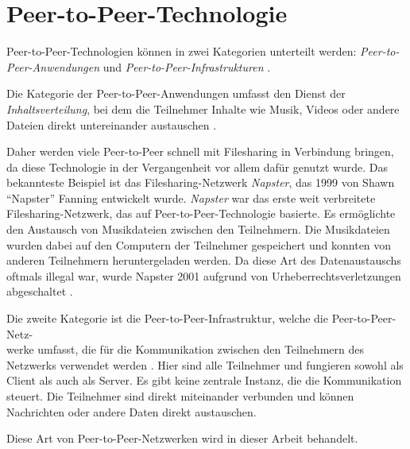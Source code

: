 \section{Peer-to-Peer-Technologie}
\label{subsec:peer_to_peer_technologie}

Peer-to-Peer-Technologien können in zwei Kategorien unterteilt werden: \textit{Peer-to-Peer-Anwendungen} und \textit{Peer-to-Peer-Infrastrukturen} \parencite[S. 730]{Khatibi_StructuredUnstructuredP2P}. 

Die Kategorie der Peer-to-Peer-Anwendungen umfasst den Dienst der \textit{Inhaltsverteilung}, bei dem die Teilnehmer Inhalte wie Musik, Videos oder andere Dateien direkt untereinander austauschen \Parencite[730-731]{Khatibi_StructuredUnstructuredP2P}. 

Daher werden viele Peer-to-Peer schnell mit Filesharing in Verbindung bringen, da diese Technologie in der Vergangenheit vor allem dafür genutzt wurde. Das bekannteste Beispiel ist das Filesharing-Netzwerk \textit{Napster}, das 1999 von Shawn \enquote{Napster} Fanning entwickelt wurde. \textit{Napster} war das erste weit verbreitete Filesharing-Netzwerk, das auf Peer-to-Peer-Technologie basierte. Es ermöglichte den Austausch von Musikdateien zwischen den Teilnehmern. Die Musikdateien wurden dabei auf den Computern der Teilnehmer gespeichert und konnten von anderen Teilnehmern heruntergeladen werden. Da diese Art des Datenaustauschs oftmals illegal war, wurde Napster 2001 aufgrund von Urheberrechtsverletzungen abgeschaltet \parencite[S. 55-57]{Mahlmann_P2PNetzwerke}.

Die zweite Kategorie ist die Peer-to-Peer-Infrastruktur, welche die Peer-to-Peer-Netz-\\werke umfasst, die für die Kommunikation zwischen den Teilnehmern des Netzwerks verwendet werden \parencite[S. 730-731]{Khatibi_StructuredUnstructuredP2P}. Hier sind alle Teilnehmer und fungieren sowohl als Client als auch als Server. Es gibt keine zentrale Instanz, die die Kommunikation steuert. Die Teilnehmer sind direkt miteinander verbunden und können Nachrichten oder andere Daten direkt austauschen.

Diese Art von Peer-to-Peer-Netzwerken wird in dieser Arbeit behandelt.


